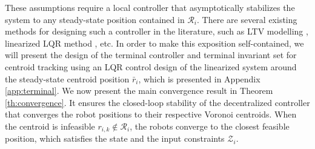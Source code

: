 These assumptions require a local controller that asymptotically stabilizes the system to any steady-state position contained in $\mathcal{R}_i$. There are several existing methods for designing such a controller in the literature, such as LTV modelling \cite{limon2018nonlinear}, linearized LQR method \cite{ chen1998quasi, kohler2019nonlinear}, etc. In order to make this exposition self-contained, we will present the design of the terminal controller and terminal invariant set for centroid tracking using an LQR control design of the linearized system around the steady-state centroid position $\bar{r}_i$, which is presented in Appendix \ref{app:terminal}.    
We now present the main convergence result in Theorem \ref{th:convergence}. It ensures the closed-loop stability of the decentralized controller that converges the robot positions to their respective Voronoi centroids. When the centroid is infeasible $r_{i,k} \notin \mathcal{R}_i$, the robots converge to the closest feasible position, which satisfies the state and the input constraints $\mathcal{Z}_i$. 
